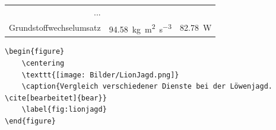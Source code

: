 \documentclass["WS\space 16-17\space -\space LaTeX-Kurs\space -\space Praesentation\space -\space 3.tex"]{subfiles}
\begin{document}
\begin{frame}[fragile]
	\Losung
	\begin{outputbox}
		\begin{centering}
			\begin{tabular}{rcc}
				...&&\\
				Grundstoffwechselumsatz	&	\SI{94.58 }{\kg\metre\tothe{2}\per\second\tothe{3}}	\cite{HAGRLowe}		&	\SI{82.78}{\watt}	\cite{HAGRMensch}
			\end{tabular}
		\end{centering}
	\end{outputbox}
	\Code
	\begin{lstlisting}
\begin{figure}
	\centering
	\texttt{[image: Bilder/LionJagd.png]}
	\caption{Vergleich verschiedener Dienste bei der Löwenjagd. \cite[bearbeitet]{bear}}
	\label{fig:lionjagd}
\end{figure}
	\end{lstlisting}
\end{frame}
\end{document}
